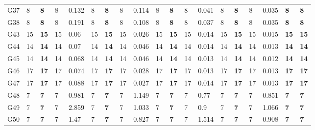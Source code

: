 \documentclass[12pt, a4paper]{article}%
\numberwithin{equation}{section}
\theoremstyle{plain}
\begin{document}
{\begin{landscape}
\begin{longtable}{lllllllllllllllllll}
						G37                       & 8    & \textbf{8}  & 8   & 0.132 & 8    & \textbf{8}  & 8   & 0.114 & 8    & \textbf{8}  & 8   & 0.041 & 8    & \textbf{8}  & 8   & 0.035 & \textbf{8}              & \textbf{8}           \\
						G38                       & 8    & \textbf{8}  & 8   & 0.191 & 8    & \textbf{8}  & 8   & 0.108 & 8    & \textbf{8}  & 8   & 0.037 & 8    & \textbf{8}  & 8   & 0.035 & \textbf{8}              & \textbf{8}           \\
						G43                       & 15   & \textbf{15} & 15  & 0.06  & 15   & \textbf{15} & 15  & 0.026 & 15   & \textbf{15} & 15  & 0.014 & 15   & \textbf{15} & 15  & 0.015 & \textbf{15}             & \textbf{15}          \\
						G44                       & 14   & \textbf{14} & 14  & 0.07  & 14   & \textbf{14} & 14  & 0.046 & 14   & \textbf{14} & 14  & 0.014 & 14   & \textbf{14} & 14  & 0.013 & \textbf{14}             & \textbf{14}          \\
						G45                       & 14   & \textbf{14} & 14  & 0.068 & 14   & \textbf{14} & 14  & 0.046 & 14   & \textbf{14} & 14  & 0.013 & 14   & \textbf{14} & 14  & 0.012 & \textbf{14}             & \textbf{14}          \\
						G46                       & 17   & \textbf{17} & 17  & 0.074 & 17   & \textbf{17} & 17  & 0.028 & 17   & \textbf{17} & 17  & 0.013 & 17   & \textbf{17} & 17  & 0.013 & \textbf{17}             & \textbf{17}          \\
						G47                       & 17   & \textbf{17} & 17  & 0.088 & 17   & \textbf{17} & 17  & 0.027 & 17   & \textbf{17} & 17  & 0.014 & 17   & \textbf{17} & 17  & 0.013 & \textbf{17}             & \textbf{17}          \\
						G48                       & 7    & \textbf{7}  & 7   & 0.981 & 7    & \textbf{7}  & 7   & 1.149 & 7    & \textbf{7}  & 7   & 0.77  & 7    & \textbf{7}  & 7   & 0.851 & \textbf{7}              & \textbf{7}           \\
						G49                       & 7    & \textbf{7}  & 7   & 2.859 & 7    & \textbf{7}  & 7   & 1.033 & 7    & \textbf{7}  & 7   & 0.9   & 7    & \textbf{7}  & 7   & 1.066 & \textbf{7}              & \textbf{7}           \\
						G50                       & 7    & \textbf{7}  & 7   & 1.47  & 7    & \textbf{7}  & 7   & 0.827 & 7    & \textbf{7}  & 7   & 1.514 & 7    & \textbf{7}  & 7   & 0.908 & \textbf{7}              & \textbf{7}           \\

\end{longtable}
\end{landscape}}
\end{document}
